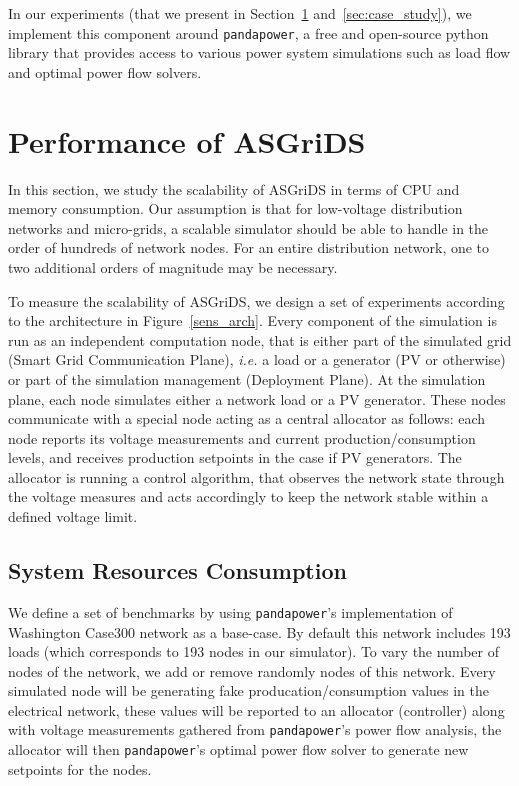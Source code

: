 \documentclass[conference]{IEEEtran}
\begin{document}
In our experiments (that we present in Section~\ref{perf} and~\ref{sec:case_study}), we implement this component around \texttt{pandapower}, a free and open-source python library that provides access to various power system simulations such as load flow and optimal power flow solvers. 

\section{Performance of ASGriDS}\label{perf}

In this section, we study the scalability of ASGriDS in terms of CPU and memory consumption. Our assumption is that for low-voltage distribution networks and micro-grids, a scalable simulator should be able to handle in the order of hundreds of network nodes. For an entire distribution network, one to two additional orders of magnitude may be necessary. 

To measure the scalability of ASGriDS, we design a set of experiments according to the architecture in Figure~\ref{sens_arch}. Every component of the simulation is run as an independent computation node, that is either part of the simulated grid (Smart Grid Communication Plane), \emph{i.e.} a load or a generator (PV or otherwise) or part of the simulation management (Deployment Plane). At the simulation plane, each node simulates either a network load or a PV generator. These nodes communicate with a special node acting as a central allocator as follows: each node reports its voltage measurements and current production/consumption levels, and receives production setpoints in the case if PV generators. The allocator is running a control algorithm, that observes the network state through the voltage measures and acts accordingly to keep the network stable within a defined voltage limit.

\subsection{System Resources Consumption}

We define a set of benchmarks by using \texttt{pandapower}'s implementation of Washington Case300 network as a base-case. By default this network includes 193 loads (which corresponds to 193 nodes in our simulator). To vary the number of nodes of the network, we add or remove randomly nodes of this network. Every simulated node will be generating fake producation/consumption values in the electrical network, these values will be reported to an allocator (controller) along with voltage measurements gathered from \texttt{pandapower}'s power flow analysis, the allocator will then \texttt{pandapower}'s optimal power flow solver to generate new setpoints for the nodes. 
\end{document}
